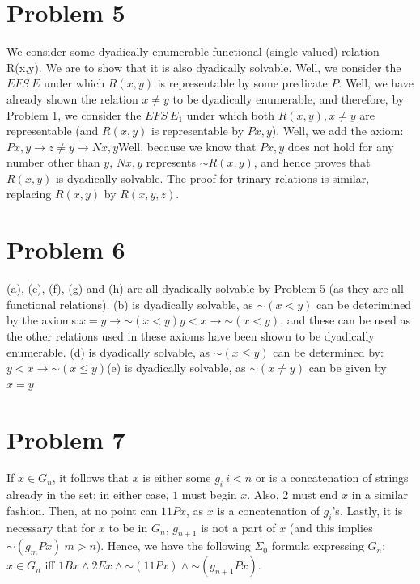 \documentclass{article}
\newcommand*{\oldneg}{\mathord{\sim}}
\theoremstyle{definition}
\begin{document}
\section*{Problem 5}
We consider some dyadically enumerable functional (single-valued) relation R(x,y). We are to show that it is also dyadically solvable. Well, we consider the 
$EFS\ E$ under which $R(x,y)$ is representable by some predicate $P$. Well, we have already shown the relation $x\ne y$ to be dyadically enumerable, and 
therefore, by Problem 1, we consider the $EFS\ E_1$ under which both $R(x,y), x\ne y$ are representable (and $R(x,y)$ is representable by $Px,y$). Well, we 
add the axiom:\newline $Px,y\rightarrow z\ne y\rightarrow Nx,y$\newline Well, because we know that $Px,y$ does not hold for any number other than $y$, 
$Nx,y$ represents $\oldneg R(x,y)$, and hence proves that $R(x,y)$ is dyadically solvable. The proof for trinary relations is similar, replacing $R(x,y)$ by 
$R(x,y,z)$.
\section*{Problem 6}
(a), (c), (f), (g) and (h) are all dyadically solvable by Problem 5 (as they are all functional relations). (b) is dyadically solvable, as $\oldneg (x<y)$ 
can be deterimined by the axioms:\newline $x=y\rightarrow \oldneg (x<y)$\newline $y<x\rightarrow \oldneg (x<y)$, and these can be used as the other relations 
used in these axioms have been shown to be dyadically enumerable. (d) is dyadically solvable, as $\oldneg (x\le y)$ can be determined by:\newline
$y<x\rightarrow \oldneg (x\le y)$\newline (e) is dyadically solvable, as $\oldneg (x\ne y)$ can be given by $x=y$\newline 
\section*{Problem 7}
If $x\in G_n$, it follows that $x$ is either some $g_i\ i<n$ or is a concatenation of strings already in the set; in either case, $1$ must begin $x$. Also, 
$2$ must end $x$ in a similar fashion. Then, at no point can $11Px$, as $x$ is a concatenation of $g_i$'s. Lastly, it is necessary that for $x$ to be in
 $G_n$, $g_{n+1}$ is not a part of $x$ (and this implies $\oldneg (g_mPx)\ m>n$). Hence, we have the following $\Sigma_0$ formula expressing $G_n$:\newline
$x\in G_n$ iff $1Bx\wedge 2Ex\wedge \oldneg (11Px)\wedge \oldneg (g_{n+1}Px)$.
\end{document}
